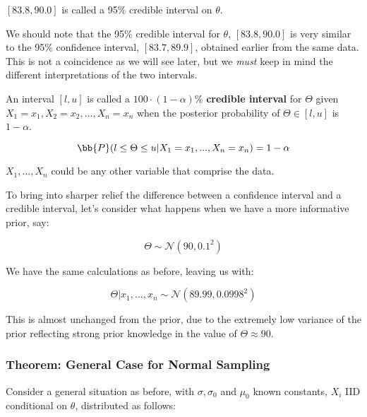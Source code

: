 \documentclass[a4paper]{article}
\begin{document}
                $[83.8, 90.0]$ is called a 95\% credible interval on $\theta$.

                \begin{warn}
                    We should note that the 95\% credible interval for $\theta$,
                    $[83.8, 90.0]$ is very similar to the 95\% confidence
                    interval, $[83.7, 89.9]$, obtained earlier from the same
                    data. This is not a coincidence as we will see later, but we
                    \textit{must} keep in mind the different interpretations of
                    the two intervals.
                \end{warn}

                \begin{definition}
                    An interval $[l, u]$ is called a $100 \cdot (1 - \alpha)\%$
                    \textbf{credible interval} for $\Theta$ given $X_1 = x_1,
                    X_2 = x_2, ..., X_n = x_n$ when the posterior probability of
                    $\Theta \in [l, u]$ is $1 - \alpha$.

                    \[
                        \bb{P}(l \leq \Theta \leq u | X_1 = x_1, ..., X_n = x_n)
                        = 1 - \alpha
                    \]

                    $X_1, ..., X_n$ could be any other variable that comprise
                    the data.
                \end{definition}

                To bring into sharper relief the difference between a confidence
                interval and a credible interval, let's consider what happens
                when we have a more informative prior, say:

                \[
                    \Theta \sim \mathcal{N}(90, 0.1^2)
                \]

                We have the same calculations as before, leaving us with:

                \[
                    \Theta | x_1, ..., x_n \sim \mathcal{N}(89.99, 0.0998^2)
                \]

                This is almost unchanged from the prior, due to the extremely
                low variance of the prior reflecting strong prior knowledge in
                the value of $\Theta \approx 90$.

            \subsubsection{Theorem: General Case for Normal Sampling}
                Consider a general situation as before, with $\sigma, \sigma_0$
                and $\mu_0$ known constants, $X_i$ IID conditional on $\theta$,
                distributed as follows:
\end{document}
